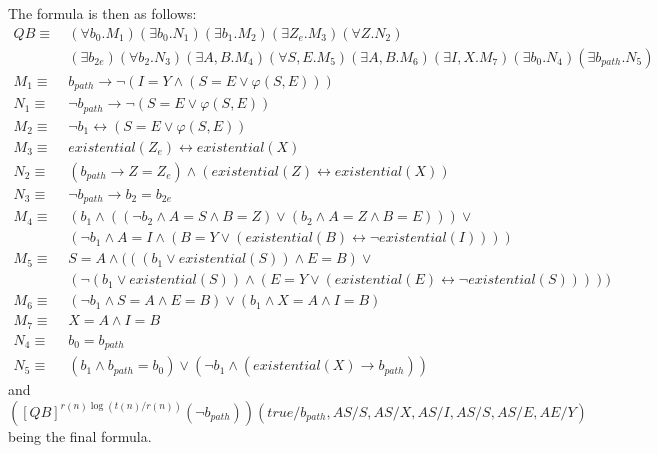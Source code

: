 The formula is then as follows:
\[
    \begin{aligned}
        QB \equiv&~(\forall b_{0}.M_{1})(\exists b_{0}.N_{1})(\exists b_{1}.M_{2})(\exists Z_{e}.M_{3})(\forall Z.N_{2})\\
        &~(\exists b_{2e})(\forall b_{2}.N_{3})(\exists A, B.M_{4})(\forall S, E.M_{5})(\exists A, B.M_{6})(\exists I, X.M_{7})(\exists b_{0}.N_{4})(\exists b_{path}.N_{5}) \\
        M_{1} \equiv&~b_{path} \to \neg(I = Y \land (S = E \lor \varphi(S, E))) \\
        N_{1} \equiv&~\neg b_{path} \to \neg(S = E \lor \varphi(S, E)) \\
        M_{2} \equiv&~\neg b_{1} \leftrightarrow (S = E \lor \varphi(S, E)) \\
        M_{3} \equiv&~existential(Z_{e}) \leftrightarrow existential(X)\\
        N_{2} \equiv&~(b_{path} \to Z = Z_{e}) \land (existential(Z) \leftrightarrow existential(X))\\
        N_{3} \equiv&~ \neg b_{path} \to b_{2} = b_{2e}\\
        M_{4} \equiv&~(b_{1} \land ((\neg b_{2} \land A = S  \land B = Z) \lor (b_{2} \land A = Z \land B = E))) \lor \\
        &~(\neg b_{1} \land  A = I \land (B = Y \lor (existential(B) \leftrightarrow \neg existential(I)))) \\
        M_{5} \equiv&~S = A \land ((( b_{1} \lor existential(S)) \land E = B) \lor \\
        &~(\neg( b_{1} \lor existential(S)) \land (E = Y \lor (existential(E)\leftrightarrow \neg existential(S))))) \\
        M_{6} \equiv&~(\neg b_{1}  \land S = A \land E = B) \lor (b_{1} \land X = A \land I = B)\\
        M_{7} \equiv&~X = A \land I = B \\
        N_{4} \equiv&~b_{0} = b_{path} \\
        N_{5} \equiv&~(b_{1} \land b_{path} = b_{0}) \lor (\neg b_{1} \land (existential(X) \to b_{path}))
    \end{aligned}
\]
and $\left([QB]^{r(n)\log(t(n)/r(n))}(\neg b_{path})\right)(true / b_{path}, AS / S, AS / X, AS /I, AS /S, AS / E, AE / Y)$ being the final formula.

